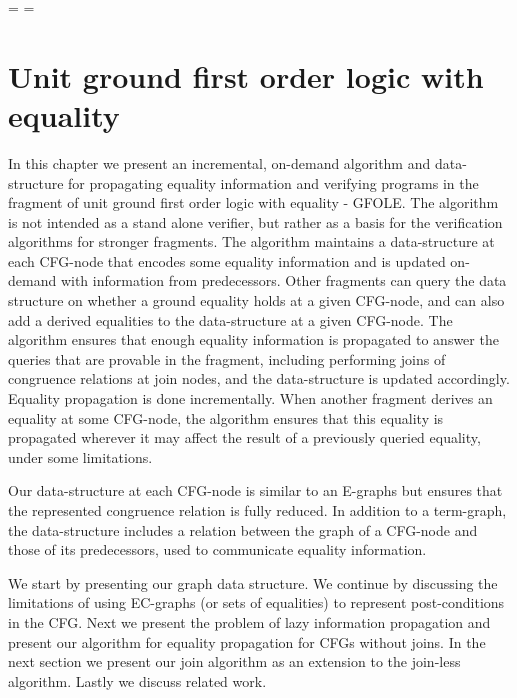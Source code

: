 \showboxdepth=\maxdimen
\showboxbreadth=\maxdimen

\chapter{Unit ground first order logic with equality}\label{chapter:ugfole}
In this chapter we present an incremental, on-demand algorithm and data-structure for propagating equality information and verifying programs in the fragment of unit ground first order logic with equality - GFOLE. 
The algorithm is not intended as a stand alone verifier, but rather as a basis for the verification algorithms for stronger fragments.
The algorithm maintains a data-structure at each CFG-node that encodes some equality information and is updated on-demand with information from predecessors.
Other fragments can query the data structure on whether a ground equality holds at a given CFG-node, and can also add a derived equalities to the data-structure at a given CFG-node. The algorithm ensures that enough equality information is propagated to answer the queries that are provable in the fragment, including performing joins of congruence relations at join nodes, and the data-structure is updated accordingly. Equality propagation is done incrementally.
When another fragment derives an equality at some CFG-node, the algorithm ensures that this equality is propagated wherever it may affect the result of a previously queried equality, under some limitations.

Our data-structure at each CFG-node is similar to an E-graphs but ensures that the represented congruence relation is fully reduced.
In addition to a term-graph, the data-structure includes a relation between the graph of a CFG-node and those of its predecessors, 
used to communicate equality information.

We start by presenting our graph data structure. 
We continue by discussing the limitations of using EC-graphs (or sets of equalities) to represent post-conditions in the CFG.
Next we present the problem of lazy information propagation and present our algorithm for equality propagation for CFGs without joins.
In the next section we present our join algorithm as an extension to the join-less algorithm.
Lastly we discuss related work.






